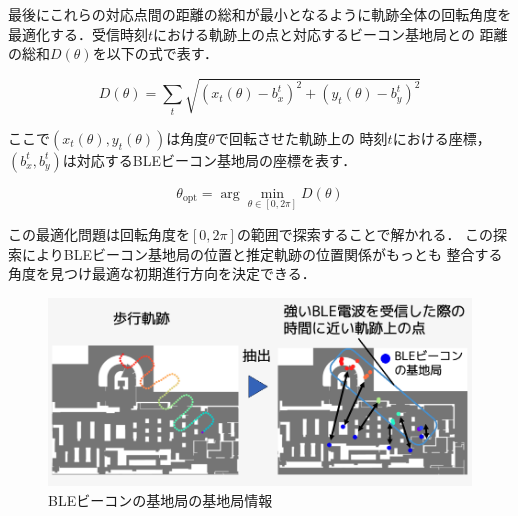 最後にこれらの対応点間の距離の総和が最小となるように軌跡全体の回転角度を
最適化する．受信時刻$t$における軌跡上の点と対応するビーコン基地局との
距離の総和$D(\theta)$を以下の式で表す．

\begin{equation}
D(\theta) = \sum_{t} \sqrt{(x_t(\theta) - b_x^t)^2 + (y_t(\theta) - b_y^t)^2}
\end{equation}

ここで$(x_t(\theta), y_t(\theta))$は角度$\theta$で回転させた軌跡上の
時刻$t$における座標，$(b_x^t, b_y^t)$は対応するBLEビーコン基地局の座標を表す．

\begin{equation}
\theta_{\mathrm{opt}} = \arg\min_{\theta \in [0, 2\pi]} D(\theta)
\end{equation}

この最適化問題は回転角度を$[0, 2\pi]$の範囲で探索することで解かれる．
この探索によりBLEビーコン基地局の位置と推定軌跡の位置関係がもっとも
整合する角度を見つけ最適な初期進行方向を決定できる．

\begin{figure}[H]
	\centering
	\includegraphics[width=\linewidth]{../image/ble-merge.jpg}
	\caption{BLEビーコンの基地局の基地局情報}    \label{fig:ble-merge}
\end{figure}







